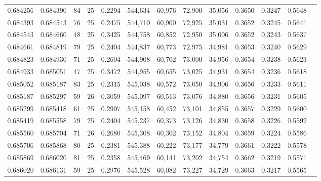 \begin{tabular}{rrrrrrrrrrrrr}
0.684256 & 0.684390 &    84 &  25 &                                     0.2294 & 544,634 &  60,976 &  72,900 &  35,056 & 0.3650 & 0.3247 & 0.5648 \\
0.684393 & 0.684543 &    76 &  25 &                                     0.2475 & 544,710 &  60,900 &  72,925 &  35,031 & 0.3652 & 0.3245 & 0.5641 \\
0.684543 & 0.684660 &    48 &  25 &                                     0.3425 & 544,758 &  60,852 &  72,950 &  35,006 & 0.3652 & 0.3243 & 0.5637 \\
0.684661 & 0.684819 &    79 &  25 &                                     0.2404 & 544,837 &  60,773 &  72,975 &  34,981 & 0.3653 & 0.3240 & 0.5629 \\
0.684823 & 0.684930 &    71 &  25 &                                     0.2604 & 544,908 &  60,702 &  73,000 &  34,956 & 0.3654 & 0.3238 & 0.5623 \\
0.684933 & 0.685051 &    47 &  25 &                                     0.3472 & 544,955 &  60,655 &  73,025 &  34,931 & 0.3654 & 0.3236 & 0.5618 \\
0.685052 & 0.685187 &    83 &  25 &                                     0.2315 & 545,038 &  60,572 &  73,050 &  34,906 & 0.3656 & 0.3233 & 0.5611 \\
0.685187 & 0.685297 &    59 &  26 &                                     0.3059 & 545,097 &  60,513 &  73,076 &  34,880 & 0.3656 & 0.3231 & 0.5605 \\
0.685299 & 0.685418 &    61 &  25 &                                     0.2907 & 545,158 &  60,452 &  73,101 &  34,855 & 0.3657 & 0.3229 & 0.5600 \\
0.685419 & 0.685558 &    79 &  25 &                                     0.2404 & 545,237 &  60,373 &  73,126 &  34,830 & 0.3658 & 0.3226 & 0.5592 \\
0.685560 & 0.685704 &    71 &  26 &                                     0.2680 & 545,308 &  60,302 &  73,152 &  34,804 & 0.3659 & 0.3224 & 0.5586 \\
0.685706 & 0.685868 &    80 &  25 &                                     0.2381 & 545,388 &  60,222 &  73,177 &  34,779 & 0.3661 & 0.3222 & 0.5578 \\
0.685869 & 0.686020 &    81 &  25 &                                     0.2358 & 545,469 &  60,141 &  73,202 &  34,754 & 0.3662 & 0.3219 & 0.5571 \\
0.686020 & 0.686131 &    59 &  25 &                                     0.2976 & 545,528 &  60,082 &  73,227 &  34,729 & 0.3663 & 0.3217 & 0.5565 \\

\end{tabular}

